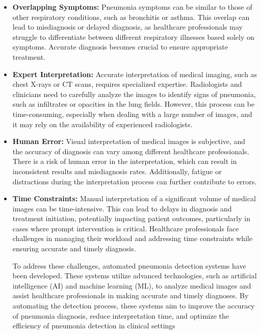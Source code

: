 \documentclass[25pt,a0paper, portrait]{tikzposter}
\begin{document}
	\begin{columns} 
		
		{
			{
				\begin{itemize}
					\item  \textbf{Overlapping Symptoms:} Pneumonia symptoms can be similar to those of other respiratory conditions, such as bronchitis or asthma. This overlap can lead to misdiagnosis or delayed diagnosis, as healthcare professionals may struggle to differentiate between different respiratory illnesses based solely on symptoms. Accurate diagnosis becomes crucial to ensure appropriate treatment. \bigskip
					
					\item \textbf{Expert Interpretation:} Accurate interpretation of medical imaging, such as chest X-rays or CT scans, requires specialized expertise. Radiologists and clinicians need to carefully analyze the images to identify signs of pneumonia, such as infiltrates or opacities in the lung fields. However, this process can be time-consuming, especially when dealing with a large number of images, and it may rely on the availability of experienced radiologists. \bigskip
					
					\item \textbf{Human Error:} Visual interpretation of medical images is subjective, and the accuracy of diagnosis can vary among different healthcare professionals. There is a risk of human error in the interpretation, which can result in inconsistent results and misdiagnosis rates. Additionally, fatigue or distractions during the interpretation process can further contribute to errors.\bigskip
					
					\item \textbf{Time Constraints:} Manual interpretation of a significant volume of medical images can be time-intensive. This can lead to delays in diagnosis and treatment initiation, potentially impacting patient outcomes, particularly in cases where prompt intervention is critical. Healthcare professionals face challenges in managing their workload and addressing time constraints while ensuring accurate and timely diagnosis. \bigskip
					
					To address these challenges, automated pneumonia detection systems have been developed. These systems utilize advanced technologies, such as artificial intelligence (AI) and machine learning (ML), to analyze medical images and assist healthcare professionals in making accurate and timely diagnoses. By automating the detection process, these systems aim to improve the accuracy of pneumonia diagnosis, reduce interpretation time, and optimize the efficiency of pneumonia detection in clinical settings
					\bigskip
					

\end{itemize}}}
\end{columns}
\end{document}

